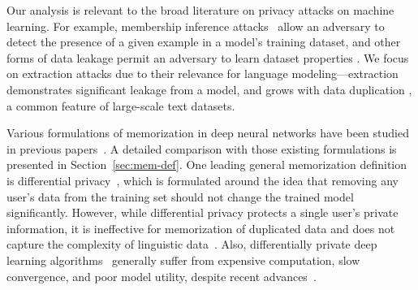 Our analysis is relevant to the broad literature on privacy attacks on machine learning.
For example, membership inference attacks~\citep{shokri2017membership, yeom2018privacy} allow an adversary to detect the presence of a given example in a model's training dataset, and other forms of data leakage permit an adversary to learn dataset properties \citep{ganju2018property,fredrikson2015model}.
We focus on extraction attacks due to their relevance for language modeling---extraction demonstrates significant leakage from a model, and grows with data duplication \citep{2021dedup}, a common feature of large-scale text datasets.


Various formulations of memorization in deep neural networks have been studied in previous papers~\citep{carlini2019secret,carlini2020extracting,feldman2020neural,zhang2021counterfactual,colinpaper}. A detailed comparison with those existing formulations is presented in Section~\ref{sec:mem-def}.
One leading general memorization definition is differential privacy~\citep{dwork2006calibrating}, which is formulated around the idea that removing any user's data from the training set should not change the trained model significantly.
However, while differential privacy protects a single user's private information, it is ineffective for memorization of duplicated data and does not capture the complexity of linguistic data~\citep{brown2022does}.
Also, differentially private deep learning algorithms~\citep{abadi2016deep} generally suffer from expensive computation, slow convergence, and poor model utility, despite recent advances~\citep{anil2021large}.


